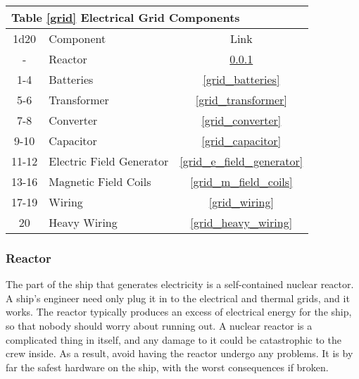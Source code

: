 \documentclass[a4paper]{article}
\begin{document}
\vspace{0.5cm} \hspace{0.25\linewidth}
\begin{tabular}{@{} | c | l | c | @{}}
\toprule
\multicolumn{3}{|l|}{Table \ref{grid} Electrical Grid Components} \\
\toprule
1d20 & Component & Link \\
\midrule
- & Reactor & \ref{grid_reactor} \\
1-4 & Batteries & \ref{grid_batteries} \\
5-6 & Transformer & \ref{grid_transformer} \\
7-8 & Converter & \ref{grid_converter} \\
9-10 & Capacitor & \ref{grid_capacitor} \\
11-12 & Electric Field Generator & \ref{grid_e_field_generator} \\
13-16 & Magnetic Field Coils & \ref{grid_m_field_coils} \\
17-19 & Wiring & \ref{grid_wiring} \\
20 & Heavy Wiring & \ref{grid_heavy_wiring} \\
\bottomrule
\end{tabular}

\hspace{-18pt} \subsubsection{Reactor} \label{grid_reactor} \vspace{-0.2cm}
The part of the ship that generates electricity is a self-contained nuclear reactor. A ship's engineer need only plug it in to the electrical and thermal grids, and it works. The reactor typically produces an excess of electrical energy for the ship, so that nobody should worry about running out. A nuclear reactor is a complicated thing in itself, and any damage to it could be catastrophic to the crew inside. As a result, avoid having the reactor undergo any problems. It is by far the safest hardware on the ship, with the worst consequences if broken.
\end{document}
